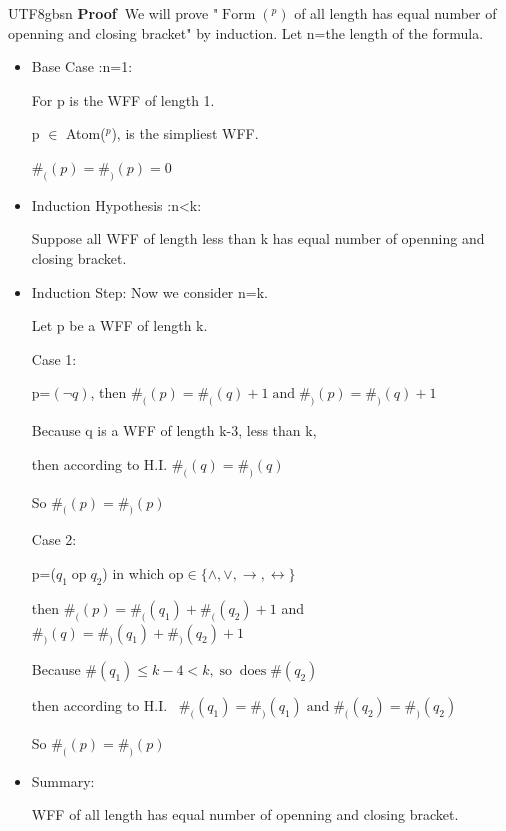 \documentclass{article}
\newcommand{\nonconverted}[1]{\mbox{}}
\begin{document}
\begin{CJK*}{UTF8}{gbsn}
\noindent\textbf{Proof\ }We will prove "$\ensuremath{\operatorname{Form}}
(\nonconverted{cal*L}^p)$ of all length has equal number of openning and
closing bracket" by induction. Let n=the length of the formula.
\begin{itemize}
  \renewcommand{\labelitemi}{$\bullet$}\renewcommand{\labelitemii}{$\bullet$}\renewcommand{\labelitemiii}{$\bullet$}\renewcommand{\labelitemiv}{$\bullet$}\item
  Base Case :n=1:
  
  For p is the WFF of length 1.
  
  p $\in$ Atom($\nonconverted{cal*L}^p$), is the simpliest WFF.
  
  $\#_{(} (p) =\#_{)} (p) = 0 $
  
  \item Induction Hypothesis :n<k:
  
  Suppose all WFF of length less than k has equal number of openning and
  closing bracket.
  
  \item Induction Step: Now we consider n=k.
  
  Let p be a WFF of length k.
  
  Case 1:
  
  p=$(\neg q)$, then $\#_{(} (p) =\#_{(} (q) +
  1\ensuremath{\operatorname{and}} \#_{)} (p) =\#_{)} (q) + 1$
  
  Because q is a WFF of length k-3, less than k,
  
  then according to H.I. $\#_{(} (q) =\#_{)} (q)$
  
  So $\#_{(} (p) =\#_{)} (p)$
  
  Case 2:
  
  p=($q_1 \ensuremath{\operatorname{op}}q_2$) in which op$\in \{ \wedge, \vee,
  \rightarrow, \leftrightarrow \}$
  
  then $\#_{(} (p) =\#_{(} (q_1) +\#_{(} (q_2) + 1$ and $\#_{)} (q) =\#_{)}
  (q_1) +\#_{)} (q_2) + 1$
  
  Because \#$(q_1) \leqslant k - 4 < k,
  \ensuremath{\operatorname{so}}\ensuremath{\operatorname{does}}\# (q_2)$
  
  then according to H.I. \ $\#_{(} (q_1) =\#_{)} (q_1)
  \ensuremath{\operatorname{and}}\#_{(} (q_2) =\#_{)} (q_2)$
  
  So $\#_{(} (p) =\#_{)} (p)$
  
  \item Summary:
  
  WFF of all length has equal number of openning and closing bracket.
  

\end{itemize}
\end{CJK*}
\end{document}
